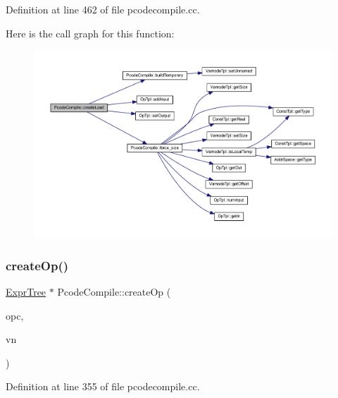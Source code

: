 Definition at line 462 of file pcodecompile.\+cc.

Here is the call graph for this function\+:
\nopagebreak
\begin{figure}[H]
\begin{center}
\leavevmode
\includegraphics[width=350pt]{class_pcode_compile_a1731825ce7ddacbdfacb59416a3876c1_cgraph}
\end{center}
\end{figure}
\mbox{\label{class_pcode_compile_ac653b660ec1b9cf01d6f8e84f916db99}} 
\subsubsection{\texorpdfstring{createOp()}{createOp()}\hspace{0.1cm}{\footnotesize\ttfamily [1/2]}}
{\footnotesize\ttfamily \mbox{\hyperlink{class_expr_tree}{Expr\+Tree}} $\ast$ Pcode\+Compile\+::create\+Op (\begin{DoxyParamCaption}\item[{\mbox{\hyperlink{opcodes_8hh_abeb7dfb0e9e2b3114e240a405d046ea7}{Op\+Code}}}]{opc,  }\item[{\mbox{\hyperlink{class_expr_tree}{Expr\+Tree}} $\ast$}]{vn }\end{DoxyParamCaption})}



Definition at line 355 of file pcodecompile.\+cc.

